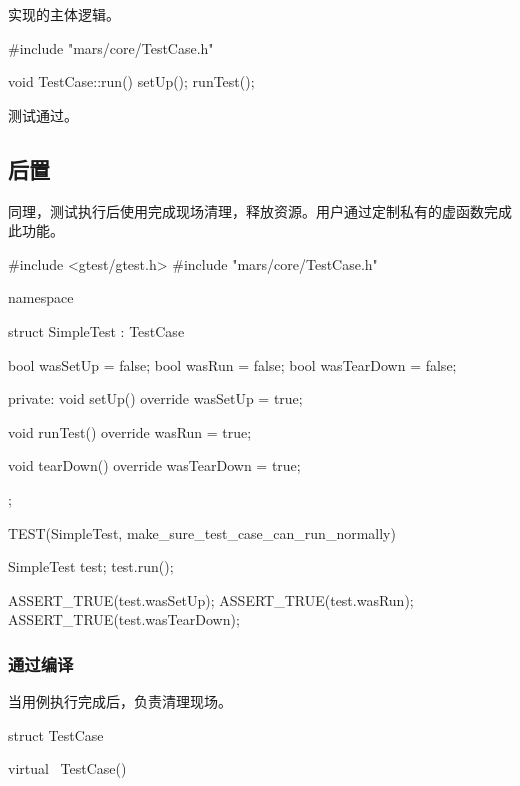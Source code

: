 \begin{content}
实现的主体逻辑。

\begin{leftbar}
 \begin{c++}[caption={\ttfamily{src/mars/core/TestCase.cc}}]
#include "mars/core/TestCase.h"

void TestCase::run() {
  setUp();
  runTest();
}

 \end{c++}
\end{leftbar}

测试通过。

\subsection{后置}

同理，测试执行后使用完成现场清理，释放资源。用户通过定制私有的虚函数完成此功能。

\begin{leftbar}
 \begin{c++}[caption={\ttfamily{test/mars/core/TestCaseSpec.cc}}]
#include <gtest/gtest.h>
#include "mars/core/TestCase.h"

namespace {
  struct SimpleTest : TestCase {
    bool wasSetUp = false;
    bool wasRun = false;
    bool wasTearDown = false;

  private:
    void setUp() override {
      wasSetUp = true;
    }

    void runTest() override {
      wasRun = true;
    }

    void tearDown() override {
      wasTearDown = true;
    }
  };
}

TEST(SimpleTest, make_sure_test_case_can_run_normally) {
  SimpleTest test;
  test.run();

  ASSERT_TRUE(test.wasSetUp);
  ASSERT_TRUE(test.wasRun);
  ASSERT_TRUE(test.wasTearDown);  
}
 \end{c++}
\end{leftbar}

\subsubsection{通过编译}

当用例执行完成后，负责清理现场。

\begin{leftbar}
 \begin{c++}[caption={\ttfamily{include/mars/core/TestCase.h}}]
struct TestCase {
  virtual ~TestCase() {}

}
\end{c++}
\end{leftbar}
\end{content}
